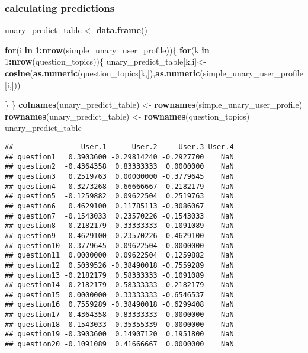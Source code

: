 \documentclass[]{article}
\newenvironment{Shaded}{\begin{snugshade}}{\end{snugshade}}
\newcommand{\ControlFlowTok}[1]{\textcolor[rgb]{0.13,0.29,0.53}{\textbf{#1}}}
\newcommand{\DecValTok}[1]{\textcolor[rgb]{0.00,0.00,0.81}{#1}}
\newcommand{\KeywordTok}[1]{\textcolor[rgb]{0.13,0.29,0.53}{\textbf{#1}}}
\newcommand{\NormalTok}[1]{#1}
\newcommand{\OperatorTok}[1]{\textcolor[rgb]{0.81,0.36,0.00}{\textbf{#1}}}
\newcommand{\StringTok}[1]{\textcolor[rgb]{0.31,0.60,0.02}{#1}}
\begin{document}
\hypertarget{calculating-predictions}{%
\subsubsection{calculating predictions}\label{calculating-predictions}}

\begin{Shaded}
\begin{Highlighting}[]
\NormalTok{unary_predict_table <-}\StringTok{ }\KeywordTok{data.frame}\NormalTok{()}


\ControlFlowTok{for}\NormalTok{(i }\ControlFlowTok{in} \DecValTok{1}\OperatorTok{:}\KeywordTok{nrow}\NormalTok{(simple_unary_user_profile))\{}
  \ControlFlowTok{for}\NormalTok{(k }\ControlFlowTok{in} \DecValTok{1}\OperatorTok{:}\KeywordTok{nrow}\NormalTok{(question_topics))\{}
\NormalTok{    unary_predict_table[k,i]<-}\StringTok{ }\KeywordTok{cosine}\NormalTok{(}\KeywordTok{as.numeric}\NormalTok{(question_topics[k,]),}\KeywordTok{as.numeric}\NormalTok{(simple_unary_user_profile[i,]))}
  
\NormalTok{  \}}
\NormalTok{\}}
\KeywordTok{colnames}\NormalTok{(unary_predict_table) <-}\StringTok{ }\KeywordTok{rownames}\NormalTok{(simple_unary_user_profile)}
\KeywordTok{rownames}\NormalTok{(unary_predict_table) <-}\StringTok{ }\KeywordTok{rownames}\NormalTok{(question_topics)}
\NormalTok{unary_predict_table}
\end{Highlighting}
\end{Shaded}

\begin{verbatim}
##                User.1      User.2     User.3 User.4
## question1   0.3903600 -0.29814240 -0.2927700    NaN
## question2  -0.4364358  0.83333333  0.0000000    NaN
## question3   0.2519763  0.00000000 -0.3779645    NaN
## question4  -0.3273268  0.66666667 -0.2182179    NaN
## question5  -0.1259882  0.09622504  0.2519763    NaN
## question6   0.4629100  0.11785113 -0.3086067    NaN
## question7  -0.1543033  0.23570226 -0.1543033    NaN
## question8  -0.2182179  0.33333333  0.1091089    NaN
## question9   0.4629100 -0.23570226 -0.4629100    NaN
## question10 -0.3779645  0.09622504  0.0000000    NaN
## question11  0.0000000  0.09622504  0.1259882    NaN
## question12  0.5039526 -0.38490018 -0.7559289    NaN
## question13 -0.2182179  0.58333333 -0.1091089    NaN
## question14 -0.2182179  0.58333333  0.2182179    NaN
## question15  0.0000000  0.33333333 -0.6546537    NaN
## question16  0.7559289 -0.38490018 -0.6299408    NaN
## question17 -0.4364358  0.83333333  0.0000000    NaN
## question18  0.1543033  0.35355339  0.0000000    NaN
## question19 -0.3903600  0.14907120  0.1951800    NaN
## question20 -0.1091089  0.41666667  0.0000000    NaN
\end{verbatim}
\end{document}
